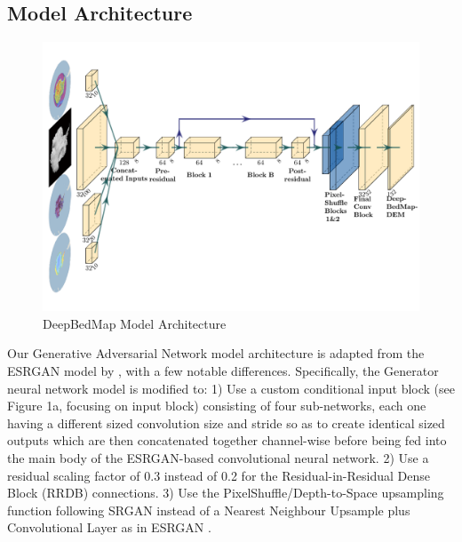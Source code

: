 \documentclass[tc, manuscript]{copernicus}
\begin{document}
\subsection{Model Architecture}

\begin{figure}[h]
  \includegraphics[width=16cm]{figures/deepbedmap_architecture.pdf}
  \caption{DeepBedMap Model Architecture}
  \label{}
\end{figure}

Our Generative Adversarial Network model architecture is adapted from the ESRGAN model by \citet{WangESRGANEnhancedSuperResolution2018}, with a few notable differences.
Specifically, the Generator neural network model is modified to:
1) Use a custom conditional input block (see Figure 1a, focusing on input block) consisting of four sub-networks, each one having a different sized convolution size and stride so as to create identical sized outputs which are then concatenated together channel-wise before being fed into the main body of the ESRGAN-based convolutional neural network.
2) Use a residual scaling factor \citep{SzegedyInceptionv4InceptionResNetImpact2016} of 0.3 instead of 0.2 for the Residual-in-Residual Dense Block (RRDB) connections.
3) Use the PixelShuffle/Depth-to-Space upsampling function \citep{ShiRealTimeSingleImage2016} following SRGAN \citep{LedigPhotoRealisticSingleImage2016} instead of a Nearest Neighbour Upsample plus Convolutional Layer as in ESRGAN \citep{WangESRGANEnhancedSuperResolution2018}.
\end{document}
